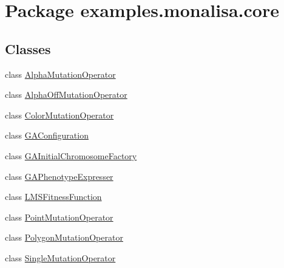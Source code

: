 \hypertarget{namespaceexamples_1_1monalisa_1_1core}{\section{Package examples.\-monalisa.\-core}
\label{namespaceexamples_1_1monalisa_1_1core}
}
\subsection*{Classes}
\begin{DoxyCompactItemize}
\item 
class \hyperlink{classexamples_1_1monalisa_1_1core_1_1_alpha_mutation_operator}{Alpha\-Mutation\-Operator}
\item 
class \hyperlink{classexamples_1_1monalisa_1_1core_1_1_alpha_off_mutation_operator}{Alpha\-Off\-Mutation\-Operator}
\item 
class \hyperlink{classexamples_1_1monalisa_1_1core_1_1_color_mutation_operator}{Color\-Mutation\-Operator}
\item 
class \hyperlink{classexamples_1_1monalisa_1_1core_1_1_g_a_configuration}{G\-A\-Configuration}
\item 
class \hyperlink{classexamples_1_1monalisa_1_1core_1_1_g_a_initial_chromosome_factory}{G\-A\-Initial\-Chromosome\-Factory}
\item 
class \hyperlink{classexamples_1_1monalisa_1_1core_1_1_g_a_phenotype_expresser}{G\-A\-Phenotype\-Expresser}
\item 
class \hyperlink{classexamples_1_1monalisa_1_1core_1_1_l_m_s_fitness_function}{L\-M\-S\-Fitness\-Function}
\item 
class \hyperlink{classexamples_1_1monalisa_1_1core_1_1_point_mutation_operator}{Point\-Mutation\-Operator}
\item 
class \hyperlink{classexamples_1_1monalisa_1_1core_1_1_polygon_mutation_operator}{Polygon\-Mutation\-Operator}
\item 
class \hyperlink{classexamples_1_1monalisa_1_1core_1_1_single_mutation_operator}{Single\-Mutation\-Operator}
\end{DoxyCompactItemize}
